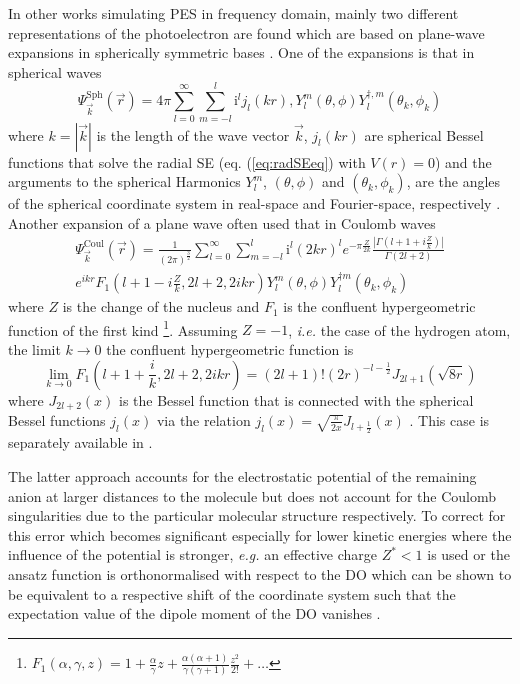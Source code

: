 In other works simulating PES in frequency domain, mainly two different representations of the photoelectron are found which are based on plane-wave expansions in spherically symmetric bases \cite{ezDyson,DO_TDDFT,do_modCoul}.
One of the expansions is that in spherical waves \cite{Lifschitz}
\begin{equation} \label{eq:spherWave}
\Psi^\text{Sph}_{\vec{k}}(\vec{r})=4\pi
\sum_{l=0}^\infty \sum_{m=-l}^l \text{i}^l j_l\left(kr\right), Y_l^m\left(\theta, \phi\right) Y^{\dagger,m}_l\left(\theta_k, \phi_k\right)
\end{equation}
where $k=|\vec{k}|$ is the length of the wave vector $\vec{k}$, $j_l(kr)$ are spherical Bessel functions that solve the radial SE (eq. (\ref{eq:radSEeq}) with $V(r)=0$) and the arguments to the spherical Harmonics $Y_l^m$, $(\theta,\phi)$ and $(\theta_k,\phi_k)$, are the angles of the spherical coordinate system in real-space and Fourier-space, respectively \cite{ezDyson}.
Another expansion of a plane wave often used that in Coulomb waves
\begin{multline} \label{eq:CoulWave}
\Psi^\text{Coul}_{\vec{k}}(\vec{r})=\frac{1}{(2\pi)^{\frac{3}{2}}}
\sum_{l=0}^\infty \sum_{m=-l}^l \text{i}^l (2kr)^l e^{-\pi\frac{Z}{2k}} \frac{|\Gamma(l+1+i\frac{Z}{k})|}{\Gamma(2l+2)} \\
e^{ikr} F_1(l+1-i\frac{Z}{k}, 2l+2, 2ikr) 
Y_l^m\left(\theta, \phi\right) Y^{\dagger m}_l\left(\theta_k, \phi_k\right)
\end{multline}
where $Z$ is the change of the nucleus and $F_1$ is the confluent hypergeometric function of the first kind \cite{do_modCoul,ColWave} \footnote{$F_1(\alpha,\gamma,z)=1+\frac{\alpha}{\gamma}z + \frac{\alpha (\alpha+1)}{\gamma (\gamma+1)} \frac{z^2}{2!}+\hdots $}.
Assuming $Z=-1$, \textit{i.e.} the case of the hydrogen atom, the limit $k\rightarrow 0$ the confluent hypergeometric function is
\begin{equation}
\lim_{k\rightarrow 0} F_1(l+1+\frac{i}{k}, 2l+2, 2ikr) =(2l+1)! (2r)^{-l-\frac 12} J_{2l+1}(\sqrt{8r})
\end{equation}
where $J_{2l+2}(x)$ is the Bessel function that is connected with the spherical Bessel functions $j_l(x)$ via the relation $j_l(x)=\sqrt{\frac{\pi}{2x}} J_{l+\frac 12}(x)$ \cite{Lifschitz}.
This case is separately available in  \cite{ezDyson}.

The latter approach accounts for the electrostatic potential of the remaining anion at larger distances to the molecule but does not account for the Coulomb singularities due to the particular molecular structure respectively.
To correct for this error which becomes significant especially for lower kinetic energies where the influence of the potential is stronger, \textit{e.g.} an effective charge $Z^*<1$ is used \cite{do_modCoul} or the ansatz function is orthonormalised with respect to the DO \cite{do_orthonorm,do_orthonorm1,do_pworth} which can be shown to be equivalent to a respective shift of the coordinate system such that the expectation value of the dipole moment of the DO vanishes \cite{do_orthonorm}.


